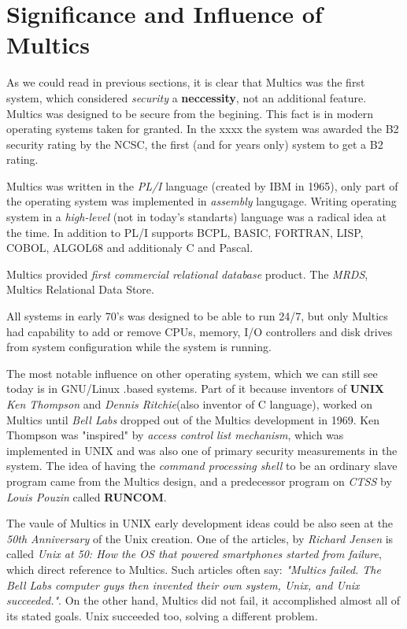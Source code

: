 
\section{Significance and Influence of Multics}

As we could read in previous sections, it is clear that Multics was the first system, which considered \textit{security} a 
\textbf{neccessity}, not an additional feature. Multics was designed to be secure from the begining. This fact is in modern 
operating systems taken for granted. In the xxxx the system was awarded the B2 security rating by the NCSC, the first 
(and for years only) system to get a B2 rating.

Multics was written in the \textit{PL/I} language (created by IBM in 1965), only part of the operating system was implemented 
in \textit{assembly} langugage. Writing operating system in a \textit{high-level} (not in today's standarts) language was a 
radical idea at the time. In addition to PL/I supports BCPL, BASIC, FORTRAN, LISP, COBOL, ALGOL68 and additionaly C and Pascal. 

Multics provided \textit{first commercial relational database} product. The \textit{MRDS}, Multics Relational Data Store.

All systems in early 70's was designed to be able to run 24/7, but only Multics had capability to add or remove CPUs, memory, 
I/O controllers and disk drives from system configuration while the system is running.

The most notable influence on other operating system, which we can still see today is in GNU/Linux .based systems.
Part of it because inventors of \textbf{UNIX} \textit{Ken Thompson} and \textit{Dennis Ritchie}(also inventor of C language), 
worked on Multics until \textit{Bell Labs} dropped out of the Multics development in 1969.
Ken Thompson was "inspired" by \textit{access control list mechanism}, which was implemented in UNIX and was also one of 
primary security measurements in the system.
The idea of having the \textit{command processing shell} to be an ordinary slave program came from the Multics design, 
and a predecessor program on \textit{CTSS} by \textit{Louis Pouzin} called \textbf{RUNCOM}.

The vaule of Multics in UNIX early development ideas could be also seen at the \textit{50th Anniversary} of the Unix creation.
One of the articles, by \textit{Richard Jensen} is called \textit{Unix at 50: How the OS that powered smartphones started from 
failure}, which direct reference to Multics. Such articles often say: \textit{"Multics failed. The Bell Labs computer guys then 
invented their own system, Unix, and Unix succeeded."}. On the other hand, Multics did not fail, it accomplished almost all of 
its stated goals. Unix succeeded too, solving a different problem.

